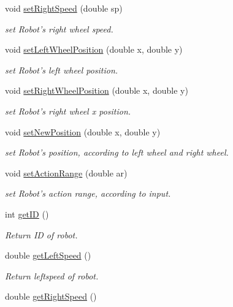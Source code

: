 \begin{DoxyCompactItemize}
void \hyperlink{classRobotClass_a202a15a9709496ca9736094af0e84ecc}{set\-Right\-Speed} (double sp)
\begin{DoxyCompactList}\small\item\em set Robot's right wheel speed. \end{DoxyCompactList}\item 
void \hyperlink{classRobotClass_a819a477d23d1c54d2094a477feed8477}{set\-Left\-Wheel\-Position} (double x, double y)
\begin{DoxyCompactList}\small\item\em set Robot's left wheel position. \end{DoxyCompactList}\item 
void \hyperlink{classRobotClass_ac72404efc5f43d9e25bcd2190a987cc5}{set\-Right\-Wheel\-Position} (double x, double y)
\begin{DoxyCompactList}\small\item\em set Robot's right wheel x position. \end{DoxyCompactList}\item 
void \hyperlink{classRobotClass_ac5980c62b0fa569360e12dc066da98a4}{set\-New\-Position} (double x, double y)
\begin{DoxyCompactList}\small\item\em set Robot's position, according to left wheel and right wheel. \end{DoxyCompactList}\item 
void \hyperlink{classRobotClass_a348207c6b74eeff725c5f329f0579482}{set\-Action\-Range} (double ar)
\begin{DoxyCompactList}\small\item\em set Robot's action range, according to input. \end{DoxyCompactList}\item 
int \hyperlink{classRobotClass_a6b817a39e292edf591c65a68a31a3012}{get\-I\-D} ()
\begin{DoxyCompactList}\small\item\em Return I\-D of robot. \end{DoxyCompactList}\item 
double \hyperlink{classRobotClass_aa37142a222c6b2fc1f877d395f0b371d}{get\-Left\-Speed} ()
\begin{DoxyCompactList}\small\item\em Return leftspeed of robot. \end{DoxyCompactList}\item 
double \hyperlink{classRobotClass_ab414f4d538c9ba99c32c0297ac8ca189}{get\-Right\-Speed} ()

\end{DoxyCompactItemize}
